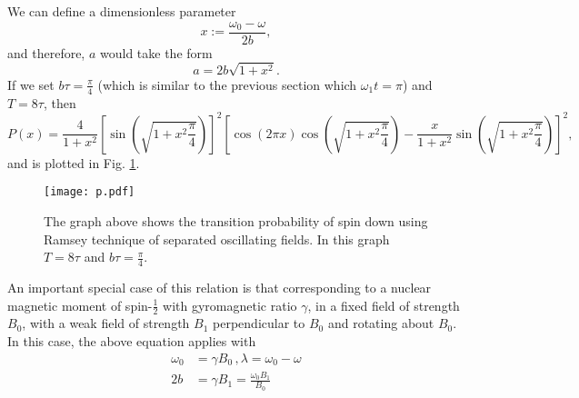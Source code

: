 %
We can define a dimensionless parameter
%
\begin{equation}
x:= \frac{\omega_0 - \omega}{2b} , 
\end{equation}
and therefore, $a$ would take the form 
\begin{equation}
a= 2b \sqrt{1+x^2} .
\end{equation}
If we set $b\tau = \frac{\pi}{4}$ (which is similar to the previous
section which $\omega_1 t= \pi$) and $T=8\tau$, then
%
\begin{equation}
P(x)= \frac{4}{1+x^2} \left[ \sin ( \sqrt{1+x^2 \frac{\pi}{4}}) \right]^2
\left[
\cos (2 \pi x) \cos (\sqrt{1+x^2 \frac{\pi}{4}}) - \frac{x}{1+x^2} \sin ( \sqrt{1+x^2 \frac{\pi}{4}}) \right] ^2 ,
\end{equation}
%
and is plotted in Fig. \ref{fig:transprob}.
% 
\begin{figure}[H]
  \centering
    \texttt{[image: p.pdf]}
    \caption{ The graph above shows the transition probability of spin
      down using Ramsey technique of separated oscillating fields. In
      this graph $T=8\tau$ and $ b \tau = \frac{\pi}{4}$. }
    \label{fig:transprob}
\end{figure}
%
An important special case of this relation is that corresponding to a
nuclear magnetic moment of spin-$\frac{1}{2}$ with gyromagnetic ratio
$\gamma$, in a fixed field of strength $B_0$, with a weak field of
strength $B_1$ perpendicular to $B_0$ and rotating about $B_0$. In
this case, the above equation applies with
\begin{align}
\omega_0 &= \gamma B_0 \, , \lambda=\omega_0 - \omega \\
2b &= \gamma B_1 =\frac{\omega_0 B_1}{B_0}
\end{align}
